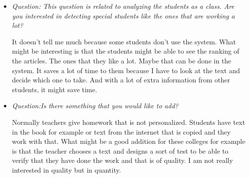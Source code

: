 \begin{itemize}
	\item \textit{Question: This question is related to analyzing the students as a class. Are you interested in detecting special students like the ones that are working a lot?}
	
It doesn't tell me much because some students don't use the system. What might be interesting is that the students might be able to see the ranking of the articles. The ones that they like a lot. Maybe that can be done in the system. It saves a lot of time to them because I have to look at the text and decide which one to take. And with a lot of extra information from other students, it might save time. 

	\item \textit{Question:Is there something that you would like to add?}
	
Normally teachers give homework that is not personalized. Students have text in the book for example or text from the internet that is copied and they work with that. What might be a good addition for these colleges for example is that the teacher chooses a text and designs a sort of test to be able to verify that they have done the work and that is of quality. I am not really interested in quality but in quantity.
\end{itemize}